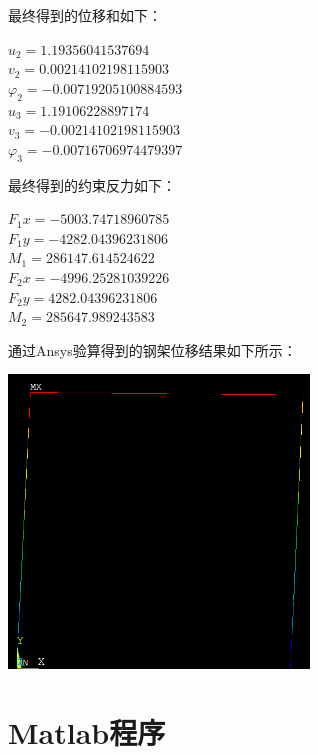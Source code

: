 \documentclass[UTF8]{ctexart}
\begin{document}
 最终得到的位移和如下：
\begin{center}
$u_2=1.19356041537694$ \\
$v_2=0.00214102198115903$ \\
$\varphi_2=-0.00719205100884593$ \\
$u_3=1.19106228897174$ \\
$v_3=-0.00214102198115903$ \\
$\varphi_3=-0.00716706974479397$
\end{center}

\smallskip

最终得到的约束反力如下：
\begin{center}
$F_1x=-5003.74718960785$ \\
$F_1y=-4282.04396231806$ \\
$M_1=286147.614524622$ \\
$F_2x=-4996.25281039226$ \\
$F_2y=4282.04396231806$ \\
$M_2=285647.989243583$
\end{center}

通过Ansys验算得到的钢架位移结果如下所示：
\begin{center}
\includegraphics[width=8cm]{ScreenClip.png}
\end{center}

\section{Matlab程序}
\end{document}
